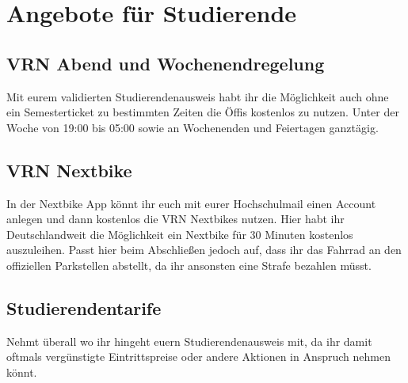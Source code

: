 \chapter{Angebote für Studierende}

\section{VRN Abend und Wochenendregelung}
Mit eurem validierten Studierendenausweis habt ihr die Möglichkeit auch ohne ein Semesterticket 
zu bestimmten Zeiten die Öffis kostenlos zu nutzen. 
Unter der Woche von 19:00 bis 05:00 sowie an Wochenenden und Feiertagen ganztägig.

\section{VRN Nextbike}
In der Nextbike App könnt ihr euch mit eurer Hochschulmail einen Account anlegen und dann 
kostenlos die VRN Nextbikes nutzen. Hier habt ihr Deutschlandweit die Möglichkeit ein Nextbike 
für 30 Minuten kostenlos auszuleihen. Passt hier beim Abschließen jedoch auf, dass ihr das Fahrrad an den
offiziellen Parkstellen abstellt, da ihr ansonsten eine Strafe bezahlen müsst. 

\section{Studierendentarife}
Nehmt überall wo ihr hingeht euern Studierendenausweis mit, da ihr damit oftmals 
vergünstigte Eintrittspreise oder andere Aktionen in Anspruch nehmen könnt.